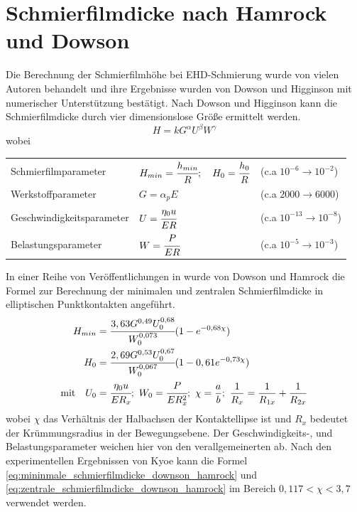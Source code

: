 \section{Schmierfilmdicke nach Hamrock und Dowson}
\label{sec:schmierfilmdicke_nach_hamrock_und_dowson}

Die Berechnung der Schmierfilmhöhe bei EHD-Schmierung wurde von vielen Autoren behandelt und ihre Ergebnisse wurden von Dowson und Higginson mit numerischer Unterstützung bestätigt.
Nach Dowson und Higginson kann die Schmierfilmdicke durch vier dimensionslose Größe ermittelt werden.
\begin{equation}
    \label{eq:allgemein_schmierfilmdicke}
    H = k G^{\alpha} U^{\beta} W^{\gamma}
\end{equation}
%
wobei

\begin{tabular}{lll}
    Schmierfilmparameter & $H_{min} = \cfrac{h_{min}}{R} ;\quad H_0 = \cfrac{h_0}{R}$ & (c.a $10^{-6} \rightarrow 10^{-2}$) \\
    Werkstoffparameter & $G = \alpha_p E$ & (c.a $2000 \rightarrow 6000$) \\
    Geschwindigkeitsparameter & $U = \cfrac{\eta_0 u}{E R}$ & (c.a $10^{-13} \rightarrow 10 ^{-8}$) \\
    Belastungsparameter & $W = \cfrac{P}{E R}$ & (c.a $10^{-5} \rightarrow 10^{-3}$)
\end{tabular}
%

In einer Reihe von Veröffentlichungen in \cite{hamrock_dowson_1976_a}\cite{hamrock_dowson_1976_b}\cite{hamrock_dowson_1977_a}\cite{hamrock_dowson_1977_b} wurde von Dowson und Hamrock die Formel zur Berechnung der minimalen und zentralen Schmierfilmdicke in elliptischen Punktkontakten angeführt.
\begin{align}
    \label{eq:mininmale_schmierfilmdicke_downson_hamrock}
    H_{min} &= \cfrac{3,63 G^{0,49} U_0^{0,68}}{W_0^{0,073}} (1 - e^{-0,68 \chi}) \\
    \label{eq:zentrale_schmierfilmdicke_downson_hamrock}
    H_0 &= \cfrac{2,69 G^{0,53} U_0^{0,67}}{W_0^{0,067}} (1 - 0,61 e^{-0,73 \chi}) \\
    \text{mit} \quad
    U_0 &= \cfrac{\eta_0 u}{E R_x};\ 
    W_0 = \cfrac{P}{E R_x^2};\
    \chi = \frac{a}{b};\
    \frac{1}{R_x} = \frac{1}{R_{1x}} + \frac{1}{R_{2x}} \nonumber 
\end{align}
%
wobei $\chi$ das Verhältnis der Halbachsen der Kontaktellipse ist und $R_x$ bedeutet der Krümmungsradius in der Bewegungsebene.
Der Geschwindigkeits-, und Belastungsparameter weichen hier von den verallgemeinerten ab.
Nach den experimentellen Ergebnissen von Kyoe kann die Formel \ref{eq:mininmale_schmierfilmdicke_downson_hamrock} und \ref{eq:zentrale_schmierfilmdicke_downson_hamrock} im Bereich $0,117 < \chi < 3,7$ verwendet werden.

